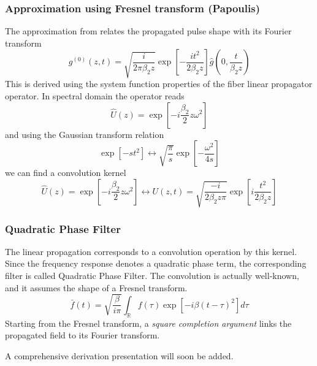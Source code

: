 \documentclass[8pt]{beamer} %
\begin{document}
\begin{frame}
	\frametitle{Approximation using Fresnel transform (Papoulis)}
	The approximation from \cite{Papoulis_1994} relates the propagated pulse shape with its Fourier transform
	\begin{equation}
		g^{(0)}(z, t)=\sqrt{\frac{i}{2 \pi \beta_{2} z}} \exp \left[-\frac{i t^{2}}{2 \beta_{2} z}\right] \hat{g}\left(0, \frac{t}{\beta_{2} z}\right)
	\end{equation}
	This is derived using the system function properties of the fiber linear propagator operator.
	In spectral domain the operator reads
	\begin{equation}
		\hat{U}(z)=\exp \left[-i \frac{\beta_{2}}{2} z \omega^{2}\right]
	\end{equation}
	and using the Gaussian transform relation
	\begin{equation}
		\exp \left[-s t^{2}\right] \longleftrightarrow \sqrt{\frac{\pi}{s}} \exp \left[-\frac{\omega^{2}}{4 s}\right]
	\end{equation}
	we can find a convolution kernel
	\begin{equation}
		\hat{U}(z)=\exp \left[-i \frac{\beta_{2}}{2} z \omega^{2}\right] \longleftrightarrow U(z, t)=\sqrt{\frac{-i}{2 \beta_{2} z \pi}} \exp \left[i \frac{t^{2}}{2 \beta_{2} z}\right]
	\end{equation}
\end{frame}

\begin{frame}
	\frametitle{Quadratic Phase Filter}
	The linear propagation corresponds to a convolution operation by this kernel. Since the frequency response denotes a quadratic phase term, the corresponding filter is called Quadratic Phase Filter.
	The convolution is actually well-known, and it assumes the shape of a Fresnel transform.
	\begin{equation}
		\bar{f}(t)=\sqrt{\frac{\beta}{i \pi}} \int_{\mathbb{R}} f(\tau) \exp \left[-i \beta(t-\tau)^{2}\right] d \tau
	\end{equation}
Starting from the Fresnel transform, a \textit{square completion argument} links the propagated field to its Fourier transform.

A comprehensive derivation presentation will soon be added.
\end{frame}
\end{document}
